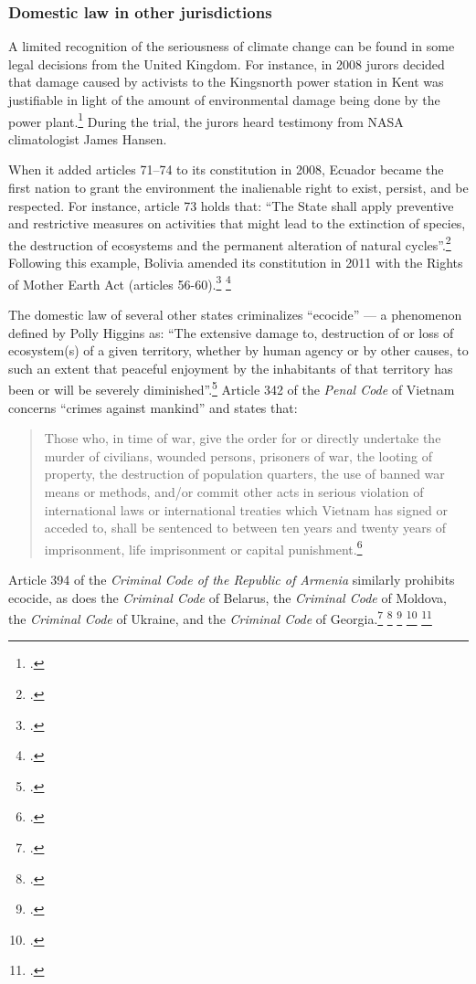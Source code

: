 		\subsubsection{Domestic law in other jurisdictions}
		
		
		
A limited recognition of the seriousness of climate change can be found in some legal decisions from the United Kingdom.
For instance, in 2008 jurors decided that damage caused by activists to the Kingsnorth power station in Kent was justifiable in light of the amount of environmental damage being done by the power plant.\footcite[][]{JuryDecides}
During the trial, the jurors heard testimony from NASA climatologist James Hansen.


When it added articles 71--74 to its constitution in 2008, Ecuador became the first nation to grant the environment the inalienable right to exist, persist, and be respected.
For instance, article 73 holds that: ``The State shall apply preventive and restrictive measures on activities that might lead to the extinction of species, the destruction of ecosystems and the permanent alteration of natural cycles''.\footcite[][]{EcuadorConstitution}
Following this example, Bolivia amended its constitution in 2011 with the Rights of Mother Earth Act (articles 56-60).\footcite[][p. 28--29]{BoliviaConstitution} \footcite[][]{BoliviaGives}



The domestic law of several other states criminalizes ``ecocide'' --- a phenomenon defined by Polly Higgins as: ``The extensive damage to, destruction of or loss of ecosystem(s) of a given territory, whether by human agency or by other causes, to such an extent that peaceful enjoyment by the inhabitants of that territory has been or will be severely diminished''.\footcite[][]{EradicatingEcocide}
Article 342 of the \emph{Penal Code} of Vietnam concerns ``crimes against mankind'' and states that:
\begin{quote}
Those who, in time of war, give the order for or directly undertake the murder of civilians, wounded persons, prisoners of war, the looting of property, the destruction of population quarters, the use of banned war means or methods, and/or commit other acts in serious violation of international laws or international treaties which Vietnam has signed or acceded to, shall be sentenced to between ten years and twenty years of imprisonment, life imprisonment or capital punishment.\footcite[][]{VietnamPenalCode}
\end{quote}
Article 394 of the \emph{Criminal Code of the Republic of Armenia} similarly prohibits ecocide, as does the \emph{Criminal Code} of Belarus, the \emph{Criminal Code} of Moldova, the \emph{Criminal Code} of Ukraine, and the \emph{Criminal Code} of Georgia.\footcite[][]{ArmeniaCriminalCode} \footcite[][]{ICRConBelarusCC} \footcite[][]{MoldovaCriminal} \footcite[][]{UkraineCriminal} \footcite[][]{GeorgiaCriminal}



